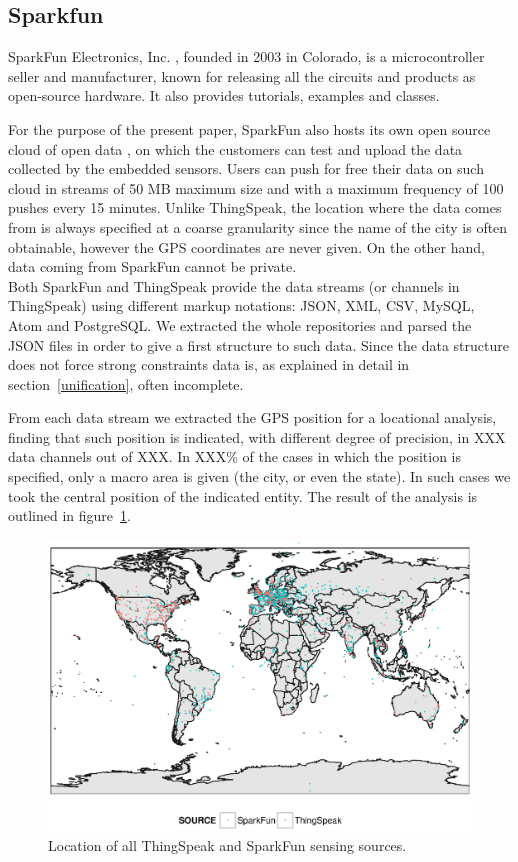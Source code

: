 \documentclass[conference]{IEEEtran}
\begin{document}
\subsection*{Sparkfun}
SparkFun Electronics, Inc. \cite{sparkfun}, founded in 2003 in Colorado, is a microcontroller seller and manufacturer, known for releasing all the circuits and products as open-source hardware.
It also provides tutorials, examples and classes.

For the purpose of the present paper, SparkFun also hosts its own open source cloud of open data \cite{sparkfundata}, on which the customers can test and upload the data collected by the embedded sensors.
Users can push for free their data on such cloud in streams of 50 MB maximum size and with a maximum frequency of 100 pushes every 15 minutes.
Unlike ThingSpeak, the location where the data comes from is always specified at a coarse granularity since the name of the city is often obtainable, however the GPS coordinates are never given.
On the other hand, data coming from SparkFun cannot be private.
\\

Both SparkFun and ThingSpeak provide the data streams (or channels in ThingSpeak) using different markup notations: JSON, XML, CSV, MySQL, Atom and PostgreSQL.
We extracted the whole repositories and parsed the JSON files in order to give a first structure to such data.
Since the data structure does not force strong constraints data is, as explained in detail in section~\ref{unification}, often incomplete.

From each data stream we extracted the GPS position for a locational analysis, finding that such position is indicated, with different degree of precision, in XXX data channels out of XXX.
In XXX\% of the cases in which the position is specified, only a macro area is given (the city, or even the state).
In such cases we took the central position of the indicated entity.
The result of the analysis is outlined in figure~\ref{geo}.

\begin{figure}[!t]
\centering
\includegraphics[width=1\textwidth]{img/map.eps} 
\caption{Location of all ThingSpeak and SparkFun sensing sources.}
\label{geo}
\end{figure}
\end{document}
